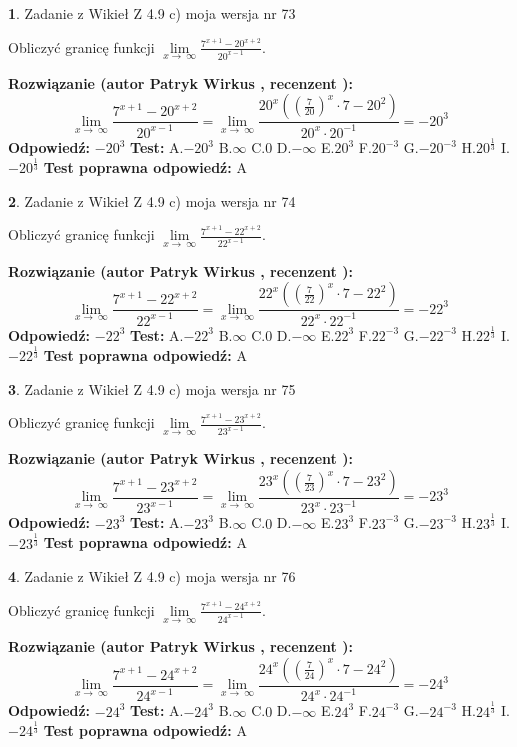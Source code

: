 \documentclass[12pt, a4paper]{article}
\theoremstyle{definition} %
\newtheorem{zad}{}
\newcommand{\zadStart}[1]{\begin{zad}#1\newline}
\newcommand{\zadStop}{\end{zad}}
\newcommand{\rozwStart}[2]{\noindent \textbf{Rozwiązanie (autor #1 , recenzent #2): }\newline}
\newcommand{\rozwStop}{\newline}
\newcommand{\odpStart}{\noindent \textbf{Odpowiedź:}\newline}
\newcommand{\odpStop}{\newline}
\newcommand{\testStart}{\noindent \textbf{Test:}\newline}
\newcommand{\testStop}{\newline}
\newcommand{\kluczStart}{\noindent \textbf{Test poprawna odpowiedź:}\newline}
\newcommand{\kluczStop}{\newline}
\begin{document}
\zadStart{Zadanie z Wikieł Z 4.9 c) moja wersja nr 73}


Obliczyć granicę funkcji  $\lim\limits_{x\to\ \infty}\frac{7^{x+1}-20^{x+2}}{20^{x-1}}$.
\zadStop
\rozwStart{Patryk Wirkus}{}
$$\lim\limits_{x\to\ \infty}\frac{7^{x+1}-20^{x+2}}{20^{x-1}}=\lim\limits_{x\to\ \infty}\frac{20^{x}((\frac{7}{20})^{x}\cdot 7 -20^{2})}{20^{x}\cdot 20^{-1}} = -20^{3}$$
\rozwStop
\odpStart
$-20^{3}$
\odpStop
\testStart
A.$-20^{3}$ B.$\infty$ C.$0$ D.$-\infty$ E.$20^{3}$
F.$20^{-3}$ G.$-20^{-3}$
H.$20^{\frac{1}{3}}$
I.$-20^{\frac{1}{3}}$
\testStop
\kluczStart
A
\kluczStop



\zadStart{Zadanie z Wikieł Z 4.9 c) moja wersja nr 74}


Obliczyć granicę funkcji  $\lim\limits_{x\to\ \infty}\frac{7^{x+1}-22^{x+2}}{22^{x-1}}$.
\zadStop
\rozwStart{Patryk Wirkus}{}
$$\lim\limits_{x\to\ \infty}\frac{7^{x+1}-22^{x+2}}{22^{x-1}}=\lim\limits_{x\to\ \infty}\frac{22^{x}((\frac{7}{22})^{x}\cdot 7 -22^{2})}{22^{x}\cdot 22^{-1}} = -22^{3}$$
\rozwStop
\odpStart
$-22^{3}$
\odpStop
\testStart
A.$-22^{3}$ B.$\infty$ C.$0$ D.$-\infty$ E.$22^{3}$
F.$22^{-3}$ G.$-22^{-3}$
H.$22^{\frac{1}{3}}$
I.$-22^{\frac{1}{3}}$
\testStop
\kluczStart
A
\kluczStop



\zadStart{Zadanie z Wikieł Z 4.9 c) moja wersja nr 75}


Obliczyć granicę funkcji  $\lim\limits_{x\to\ \infty}\frac{7^{x+1}-23^{x+2}}{23^{x-1}}$.
\zadStop
\rozwStart{Patryk Wirkus}{}
$$\lim\limits_{x\to\ \infty}\frac{7^{x+1}-23^{x+2}}{23^{x-1}}=\lim\limits_{x\to\ \infty}\frac{23^{x}((\frac{7}{23})^{x}\cdot 7 -23^{2})}{23^{x}\cdot 23^{-1}} = -23^{3}$$
\rozwStop
\odpStart
$-23^{3}$
\odpStop
\testStart
A.$-23^{3}$ B.$\infty$ C.$0$ D.$-\infty$ E.$23^{3}$
F.$23^{-3}$ G.$-23^{-3}$
H.$23^{\frac{1}{3}}$
I.$-23^{\frac{1}{3}}$
\testStop
\kluczStart
A
\kluczStop



\zadStart{Zadanie z Wikieł Z 4.9 c) moja wersja nr 76}


Obliczyć granicę funkcji  $\lim\limits_{x\to\ \infty}\frac{7^{x+1}-24^{x+2}}{24^{x-1}}$.
\zadStop
\rozwStart{Patryk Wirkus}{}
$$\lim\limits_{x\to\ \infty}\frac{7^{x+1}-24^{x+2}}{24^{x-1}}=\lim\limits_{x\to\ \infty}\frac{24^{x}((\frac{7}{24})^{x}\cdot 7 -24^{2})}{24^{x}\cdot 24^{-1}} = -24^{3}$$
\rozwStop
\odpStart
$-24^{3}$
\odpStop
\testStart
A.$-24^{3}$ B.$\infty$ C.$0$ D.$-\infty$ E.$24^{3}$
F.$24^{-3}$ G.$-24^{-3}$
H.$24^{\frac{1}{3}}$
I.$-24^{\frac{1}{3}}$
\testStop
\kluczStart
A
\kluczStop
\end{document}
